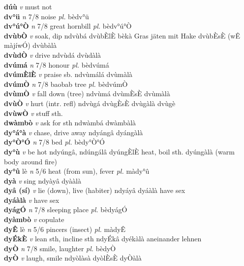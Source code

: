 \documentclass{article}
\begin{document}
{\bf dúù}  {\it v} must not         \\ 
{\bf dv°ü}  {\it n} 7/8 noise {\it pl.} bèdv°ü         \\ 
{\bf dv°ú°Ò}  {\it n} 7/8 great hornbill {\it pl.} bèdv°ú°Ò         \\ 
{\bf dvùbÒ}  {\it v} soak, dip   ndvùbá dvùbÈlÈ bèkà Gras jäten mit Hake dvùbÈsÈ (wÊ màjíwÓ) dvùbàlà   \\ 
{\bf dvùdÒ}  {\it v} drive   ndvùdá   dvùdàlà   \\ 
{\bf dvúmá}  {\it n} 7/8 honour {\it pl.} bèdvúmá         \\ 
{\bf dvúmÈlÈ}  {\it v} praise sb.   ndvùmálá   dvùmàlà   \\ 
{\bf dvúmÒ}  {\it n} 7/8 baobab tree {\it pl.} bèdvúmÒ         \\ 
{\bf dvùmÒ}  {\it v} fall down (tree)   ndvùmá  dvùmÈsÈ dvùmàlà   \\ 
{\bf dvùÒ}  {\it v} hurt (intr. refl)   ndvùgá  dvùgÈsÈ dvùgàlà  dvùgè \\ 
{\bf dvùwÒ}  {\it v} stuff sth.         \\ 
{\bf dwàmbò}  {\it v} ask for sth   ndwàmbá   dwàmbàlà   \\ 
{\bf dy°á°à}  {\it v} chase, drive away   ndyángâ   dyángàlà   \\ 
{\bf dy°Ò°Ó}  {\it n} 7/8 bed {\it pl.} bèdy°Ò°Ó         \\ 
{\bf dy°ù}  {\it v} be hot   ndyúngâ, ndúngálâ dyúngÈlÈ heat, boil sth.  dyúngàlà (warm body around fire)   \\ 
{\bf dy°û} lè {\it n} 5/6 heat (from sun), fever {\it pl.} màdy°û         \\ 
{\bf dyà}  {\it v} sing   ndyàyâ   dyààlà   \\ 
{\bf dyâ (sí)}  {\it v} lie (down), live (habiter)   ndyáyâ   dyáàlà have sex   \\ 
{\bf dyáàlà}  {\it v} have sex         \\ 
{\bf dyágÓ}  {\it n} 7/8 sleeping place {\it pl.} bèdyágÓ         \\ 
{\bf dyàmbò}  {\it v} copulate         \\ 
{\bf dyÊ} lè {\it n} 5/6 pincers (insect) {\it pl.} màdyÊ         \\ 
{\bf dyÉkÈ}  {\it v} lean sth, incline sth   ndyÉkâ   dyékàlà aneinander lehnen   \\ 
{\bf dyÒ}  {\it n} 7/8 smile, laughter {\it pl.} bèdyÒ         \\ 
{\bf dyÒ}  {\it v} laugh, smile   ndyòlàsà  dyòlÈsÈ dyÒàlà   \\ 
\end{document}
